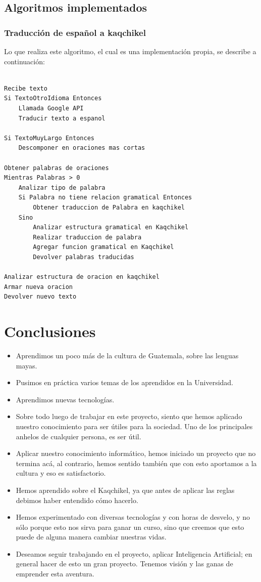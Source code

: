 \documentclass[a4paper,openright,11pt]{article}
\begin{document}
\subsection{Algoritmos implementados}
\subsubsection{Traducción de español a kaqchikel}
Lo que realiza este algoritmo, el cual es una implementación propia, se describe a continuación:

\begin{lstlisting}

Recibe texto
Si TextoOtroIdioma Entonces
	Llamada Google API
	Traducir texto a espanol

Si TextoMuyLargo Entonces
	Descomponer en oraciones mas cortas
	
Obtener palabras de oraciones
Mientras Palabras > 0
	Analizar tipo de palabra
	Si Palabra no tiene relacion gramatical Entonces
		Obtener traduccion de Palabra en kaqchikel
	Sino
		Analizar estructura gramatical en Kaqchikel
		Realizar traduccion de palabra
		Agregar funcion gramatical en Kaqchikel
		Devolver palabras traducidas
	
Analizar estructura de oracion en kaqchikel
Armar nueva oracion
Devolver nuevo texto

\end{lstlisting}
\newpage

\section{Conclusiones}
\begin{itemize}
	\item Aprendimos un poco más de la cultura de Guatemala, sobre las lenguas mayas.
	\item Pusimos en práctica varios temas de los aprendidos en la Universidad.
	\item Aprendimos nuevas tecnologías.
	\item Sobre todo luego de trabajar en este proyecto, siento que hemos aplicado nuestro conocimiento para ser útiles para la sociedad. Uno de los principales anhelos de cualquier persona, es ser útil.
	\item Aplicar nuestro conocimiento informático, hemos iniciado un proyecto que no termina acá, al contrario, hemos sentido también que con esto aportamos a la cultura y eso es satisfactorio.
	\item Hemos aprendido sobre el Kaqchikel, ya que antes de aplicar las reglas debimos haber entendido cómo hacerlo.
	\item Hemos experimentado con diversas tecnologías y con horas de desvelo, y no sólo porque esto nos sirva para ganar un curso, sino que creemos que esto puede de alguna manera cambiar nuestras vidas.
	\item Deseamos seguir trabajando en el proyecto, aplicar Inteligencia Artificial; en general hacer de esto un gran proyecto. Tenemos visión y las ganas de emprender esta aventura.
\end{itemize}
\newpage
\end{document}
